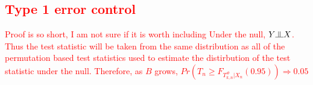 \documentclass{article}
\newcommand{\sh}{\textcolor{red}}
\newcommand{\indep}{\raisebox{0.05em}{\rotatebox[origin=c]{90}{$\models$}}}
\newcommand{\rvo}{X}
\begin{document}
\sh{\subsection{Type 1 error control}
Proof is so short, I am not sure if it is worth including
Under the null, $Y \indep \rvo$.  Thus the test statistic will be taken from the same distribution as all of the permutation based test statistics used to estimate the distirbution of the test statistic under the null.  Therefore, as $B$ grows, $Pr(T_n \geq F_{T^\#_{k,n}|\rvo_n}(0.95)) \Rightarrow 0.05$
}



\end{document}
